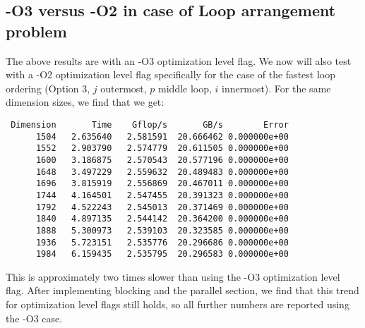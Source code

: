 \documentclass[10pt, letterpaper]{article}
\begin{document}
\subsection{-O3 versus -O2 in case of Loop arrangement problem}
The above results are with an -O3 optimization level flag. We now will also test with a -O2 optimization level flag specifically for the case of the fastest loop ordering (Option 3, $j$ outermost, $p$ middle loop, $i$ innermost). For the same dimension sizes, we find that we get:
\begin{verbatim}
 Dimension       Time    Gflop/s       GB/s        Error
      1504   2.635640   2.581591  20.666462 0.000000e+00
      1552   2.903790   2.574779  20.611505 0.000000e+00
      1600   3.186875   2.570543  20.577196 0.000000e+00
      1648   3.497229   2.559632  20.489483 0.000000e+00
      1696   3.815919   2.556869  20.467011 0.000000e+00
      1744   4.164501   2.547455  20.391323 0.000000e+00
      1792   4.522243   2.545013  20.371469 0.000000e+00
      1840   4.897135   2.544142  20.364200 0.000000e+00
      1888   5.300973   2.539103  20.323585 0.000000e+00
      1936   5.723151   2.535776  20.296686 0.000000e+00
      1984   6.159435   2.535795  20.296583 0.000000e+00
\end{verbatim}
This is approximately two times slower than using the -O3 optimization level flag. After implementing blocking and the parallel section, we find that this trend for optimization level flags still holds, so all further numbers are reported using the -O3 case.
\end{document}
